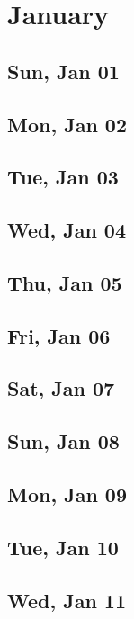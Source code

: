 \chapter{January}
	\section{Sun, Jan 01}
		
	\section{Mon, Jan 02}
		
	\section{Tue, Jan 03}
		
	\section{Wed, Jan 04}
		
	\section{Thu, Jan 05}
		
	\section{Fri, Jan 06}
		
	\section{Sat, Jan 07}
		
	\section{Sun, Jan 08}
		
	\section{Mon, Jan 09}
		
	\section{Tue, Jan 10}
		
	\section{Wed, Jan 11}
		
